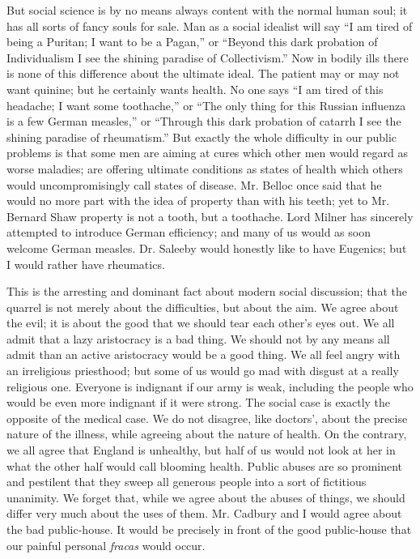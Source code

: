 \documentclass{book}
\begin{document}
But social science is by no means always content with the normal human soul; it has all sorts of fancy souls for sale. Man as a social idealist will say “I am tired of being a Puritan; I want to be a Pagan,” or “Beyond this dark probation of Individualism I see the shining paradise of Collectivism.” Now in bodily ills there is none of this difference about the ultimate ideal. The patient may or may not want quinine; but he certainly wants health. No one says “I am tired of this headache; I want some toothache,” or “The only thing for this Russian influenza is a few German measles,” or “Through this dark probation of catarrh I see the shining paradise of rheumatism.” But exactly the whole difficulty in our public problems is that some men are aiming at cures which other men would regard as worse maladies; are offering ultimate conditions as states of health which others would uncompromisingly call states of disease. Mr. Belloc once said that he would no more part with the idea of property than with his teeth; yet to Mr. Bernard Shaw property is not a tooth, but a toothache. Lord Milner has sincerely attempted to introduce German efficiency; and many of us would as soon welcome German measles. Dr. Saleeby would honestly like to have Eugenics; but I would rather have rheumatics.

This is the arresting and dominant fact about modern social discussion; that the quarrel is not merely about the difficulties, but about the aim. We agree about the evil; it is about the good that we should tear each other’s eyes out. We all admit that a lazy aristocracy is a bad thing. We should not by any means all admit than an active aristocracy would be a good thing. We all feel angry with an irreligious priesthood; but some of us would go mad with disgust at a really religious one. Everyone is indignant if our army is weak, including the people who would be even more indignant if it were strong. The social case is exactly the opposite of the medical case. We do not disagree, like doctors’, about the precise nature of the illness, while agreeing about the nature of health. On the contrary, we all agree that England is unhealthy, but half of us would not look at her in what the other half would call blooming health. Public abuses are so prominent and pestilent that they sweep all generous people into a sort of fictitious unanimity. We forget that, while we agree about the abuses of things, we should differ very much about the uses of them. Mr. Cadbury and I would agree about the bad public-house. It would be precisely in front of the good public-house that our painful personal \emph{fracas} would occur.
\end{document}
